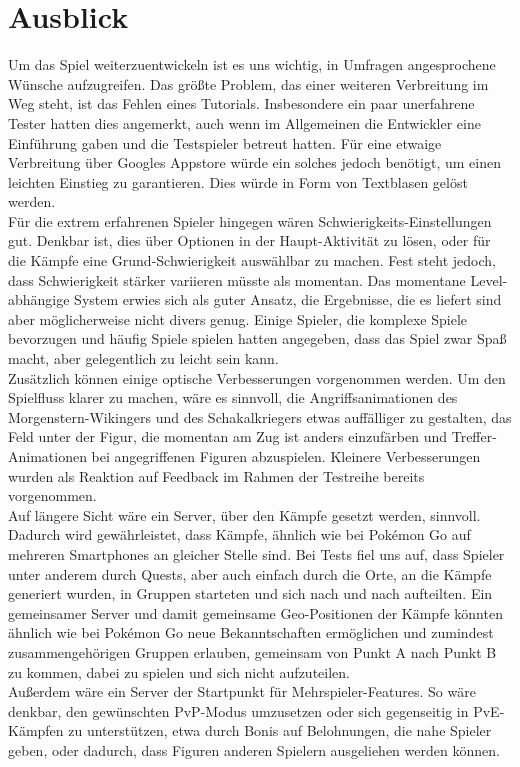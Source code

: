 \documentclass[extern,palatino]{cgBA}
\begin{document}
\section{Ausblick}Um das Spiel weiterzuentwickeln ist es uns wichtig, in Umfragen angesprochene Wünsche aufzugreifen. Das größte Problem, das einer weiteren Verbreitung im Weg steht, ist das Fehlen eines Tutorials. Insbesondere ein paar unerfahrene Tester hatten dies angemerkt, auch wenn im Allgemeinen die Entwickler eine Einführung gaben und die Testspieler betreut hatten. Für eine etwaige Verbreitung über Googles Appstore würde ein solches jedoch benötigt, um einen leichten Einstieg zu garantieren. Dies würde in Form von Textblasen gelöst werden.
\\Für die extrem erfahrenen Spieler hingegen wären Schwierigkeits-Einstellungen gut. Denkbar ist, dies über Optionen in der Haupt-Aktivität zu lösen, oder für die Kämpfe eine Grund-Schwierigkeit auswählbar zu machen. Fest steht jedoch, dass Schwierigkeit stärker variieren müsste als momentan. Das momentane Level-abhängige System erwies sich als guter Ansatz, die Ergebnisse, die es liefert sind aber möglicherweise nicht divers genug. Einige Spieler, die komplexe Spiele bevorzugen und häufig Spiele spielen hatten angegeben, dass das Spiel zwar Spaß macht, aber gelegentlich zu leicht sein kann.
\\Zusätzlich können einige optische Verbesserungen vorgenommen werden. Um den Spielfluss klarer zu machen, wäre es sinnvoll, die Angriffsanimationen des Morgenstern-Wikingers und des Schakalkriegers etwas auffälliger zu gestalten, das Feld unter der Figur, die momentan am Zug ist anders einzufärben und Treffer-Animationen bei angegriffenen Figuren abzuspielen. Kleinere Verbesserungen wurden als 
Reaktion auf Feedback im Rahmen der Testreihe bereits vorgenommen.
\\Auf längere Sicht wäre ein Server, über den Kämpfe gesetzt werden, sinnvoll. Dadurch wird gewährleistet, dass Kämpfe, ähnlich wie bei Pokémon Go auf mehreren Smartphones an gleicher Stelle sind. Bei Tests fiel uns auf, dass Spieler unter anderem durch Quests, aber auch einfach durch die Orte, an die Kämpfe generiert wurden, in Gruppen starteten und sich nach und nach aufteilten. Ein gemeinsamer Server und damit gemeinsame Geo-Positionen der Kämpfe könnten ähnlich wie bei Pokémon Go neue Bekanntschaften ermöglichen und zumindest zusammengehörigen Gruppen erlauben, gemeinsam von Punkt A nach Punkt B zu kommen, dabei zu spielen und sich nicht aufzuteilen.
\\Außerdem wäre ein Server der Startpunkt für Mehrspieler-Features. So wäre denkbar, den gewünschten PvP-Modus umzusetzen oder sich gegenseitig in PvE-Kämpfen zu unterstützen, etwa durch Bonis auf Belohnungen, die nahe Spieler geben, oder dadurch, dass Figuren anderen Spielern ausgeliehen werden können.


\end{document}
